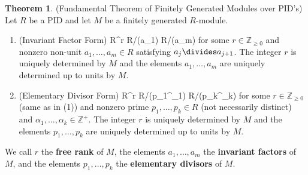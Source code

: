 \documentclass[12pt]{article}
\newcommand{\keyword}[1]{\textbf{#1}}
\def\[#1\]{\begin{align*}#1\end{align*}}
\theoremstyle{definition}
\newtheorem{theorem}{Theorem}
\newcommand{\Z}{\mathbb{Z}}
\newcommand{\<}{\left\langle}
\renewcommand{\>}{\right\rangle}
\newcommand{\isom}{\cong}
\begin{document}
\begin{theorem}(Fundamental Theorem of Finitely Generated Modules over PID's) Let $R$ be a PID and let $M$ be a finitely generated $R$-module.
    \begin{enumerate}[(1)]
        \item (Invariant Factor Form)
        \[
            M \isom R^r \dsum R/(a_1) \dsum \cdots \dsum R/(a_m)
        \]
        for some $r \in \Z_{\geq0}$ and nonzero non-unit $a_1, \dots, a_m \in R$ satisfying $a_j \divides a_{j+1}$. The integer $r$ is uniquely determined by $M$ and the elements $a_1, \dots, a_m$ are uniquely determined up to units by $M$.
        
        \item (Elementary Divisor Form)
        \[
            M \isom R^r \dsum R/(p_1^{\alpha_1}) \dsum \cdots \dsum R/(p_k^{\alpha_k})
        \]
        for some $r \in \Z_{\geq0}$ (same as in (1)) and nonzero prime $p_1, \dots, p_k \in R$ (not necessarily distinct) and $\alpha_1, \dots, \alpha_k \in \Z^+$. The integer $r$ is uniquely determined by $M$ and the elements $p_1, \dots, p_k$ are uniquely determined up to units by $M$.
    
        
    \end{enumerate}
    We call $r$ the \keyword{free rank} of $M$, the elements $a_1, \dots, a_m$ the \keyword{invariant factors} of $M$, and the elements $p_1, \dots, p_k$ the \keyword{elementary divisors} of $M$.
\end{theorem}
\end{document}
